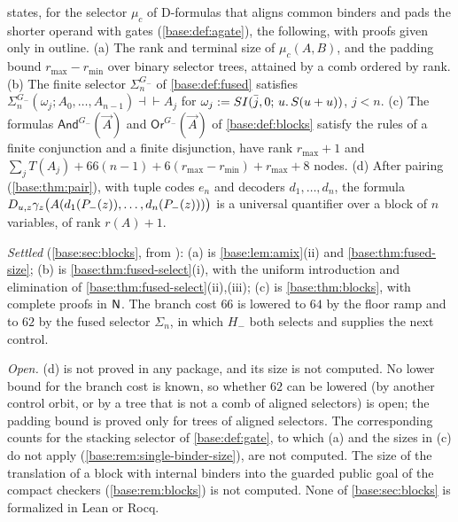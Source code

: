 \begin{question}
\label{base:q:blocks}
 states, for the selector $\mu_c$ of D-formulas that
aligns common binders and pads the shorter operand with gates
(\cref{base:def:agate}), the following, with proofs given only in outline.
(a) The rank and terminal size of $\mu_c(A,B)$, and the padding bound
$r_{\max}-r_{\min}$ over binary selector trees, attained by a comb ordered
by rank.  (b) The finite selector $\Sigma^{G_-}_n$ of \cref{base:def:fused}
satisfies $\Sigma^{G_-}_n(\omega_j;A_0,\dots,A_{n-1})\dashv\vdash A_j$ for
$\omega_j\mathrel{:=}SI(\bar j,0;\,u.\,S(u+u))$, $j<n$.  (c) The formulas
$\mathsf{And}^{G_-}(\vec A)$ and $\mathsf{Or}^{G_-}(\vec A)$ of
\cref{base:def:blocks} satisfy the rules of a finite conjunction and a
finite disjunction, have rank $r_{\max}+1$ and
$\sum_j T(A_j)+66(n-1)+6(r_{\max}-r_{\min})+r_{\max}+8$ nodes.  (d) After
pairing (\cref{base:thm:pair}), with tuple codes $e_n$ and decoders
$d_1,\dots,d_n$, the formula
$D_{u,z}\gamma_z\bigl(A(d_1(P_-(z)),\dots,d_n(P_-(z)))\bigr)$ is a
universal quantifier over a block of $n$ variables, of rank $r(A)+1$.

\emph{Settled} (\cref{base:sec:blocks}, from
): (a) is
\cref{base:lem:amix}(ii) and \cref{base:thm:fused-size}; (b) is
\cref{base:thm:fused-select}(i), with the uniform introduction and
elimination of \cref{base:thm:fused-select}(ii),(iii); (c) is
\cref{base:thm:blocks}, with complete proofs in $\mathsf{N}$.  The branch cost
$66$ is lowered to $64$ by the floor ramp and to $62$ by the fused selector
$\Sigma_n$, in which $H_-$ both selects and supplies the next control.

\emph{Open.}  (d) is not proved in any package, and its size is not
computed.  No lower bound for the branch cost is known, so whether $62$ can
be lowered (by another control orbit, or by a tree that is not a comb of
aligned selectors) is open; the padding bound is proved only for trees of
aligned selectors.  The corresponding counts for the stacking selector of
\cref{base:def:gate}, to which (a) and the sizes in (c) do not apply
(\cref{base:rem:single-binder-size}), are not computed.  The size of the
translation of a block with internal binders into the guarded public goal of
the compact checkers (\cref{base:rem:blocks}) is not computed.  None of
\cref{base:sec:blocks} is formalized in Lean or Rocq.
\end{question}

